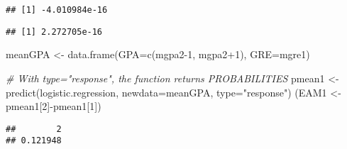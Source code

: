 \documentclass[
]{article}
\newenvironment{Shaded}{\begin{snugshade}}{\end{snugshade}}
\newcommand{\AttributeTok}[1]{\textcolor[rgb]{0.77,0.63,0.00}{#1}}
\newcommand{\CommentTok}[1]{\textcolor[rgb]{0.56,0.35,0.01}{\textit{#1}}}
\newcommand{\DecValTok}[1]{\textcolor[rgb]{0.00,0.00,0.81}{#1}}
\newcommand{\FunctionTok}[1]{\textcolor[rgb]{0.00,0.00,0.00}{#1}}
\newcommand{\NormalTok}[1]{#1}
\newcommand{\OtherTok}[1]{\textcolor[rgb]{0.56,0.35,0.01}{#1}}
\newcommand{\SpecialCharTok}[1]{\textcolor[rgb]{0.00,0.00,0.00}{#1}}
\newcommand{\StringTok}[1]{\textcolor[rgb]{0.31,0.60,0.02}{#1}}
\begin{document}
\begin{Shaded}
\end{Shaded}

\begin{verbatim}
## [1] -4.010984e-16
\end{verbatim}

\begin{Shaded}
\end{Shaded}

\begin{verbatim}
## [1] 2.272705e-16
\end{verbatim}

\begin{Shaded}
\begin{Highlighting}[]
\NormalTok{meanGPA }\OtherTok{\textless{}{-}} \FunctionTok{data.frame}\NormalTok{(}\AttributeTok{GPA=}\FunctionTok{c}\NormalTok{(mgpa2}\DecValTok{{-}1}\NormalTok{, mgpa2}\SpecialCharTok{+}\DecValTok{1}\NormalTok{), }\AttributeTok{GRE=}\NormalTok{mgre1)}

\CommentTok{\# With type="response", the function returns PROBABILITIES }
\NormalTok{pmean1 }\OtherTok{\textless{}{-}} \FunctionTok{predict}\NormalTok{(logistic.regression, }\AttributeTok{newdata=}\NormalTok{meanGPA, }\AttributeTok{type=}\StringTok{"response"}\NormalTok{)}
\NormalTok{(EAM1 }\OtherTok{\textless{}{-}}\NormalTok{ pmean1[}\DecValTok{2}\NormalTok{]}\SpecialCharTok{{-}}\NormalTok{pmean1[}\DecValTok{1}\NormalTok{])  }
\end{Highlighting}
\end{Shaded}

\begin{verbatim}
##        2 
## 0.121948
\end{verbatim}
\end{document}
